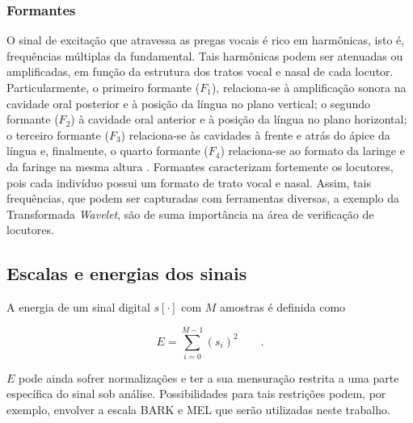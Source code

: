		\subsubsection{Formantes}
			\par O sinal de excitação que atravessa as pregas vocais é rico em harmônicas, isto é, frequências múltiplas da fundamental. Tais harmônicas podem ser atenuadas ou amplificadas, em função da estrutura dos tratos vocal e nasal de cada locutor. Particularmente, o primeiro formante ($F_1$), relaciona-se à  amplificação  sonora  na  cavidade  oral  posterior  e  à  posição  da  língua  no  plano  vertical;  o segundo  formante  ($F_2$)  à  cavidade  oral  anterior  e  à  posição  da  língua  no  plano  horizontal; o terceiro  formante  ($F_3$)  relaciona-se  às  cavidades  à  frente  e  atrás  do  ápice  da  língua e, finalmente,  o  quarto formante  ($F_4$) relaciona-se  ao  formato  da  laringe  e  da  faringe  na  mesma  altura  \cite{valencca2014analise}. Formantes caracterizam fortemente os locutores, pois cada indivíduo possui um formato de trato vocal e nasal. Assim, tais frequências, que podem ser capturadas com ferramentas diversas, a exemplo da Transformada \textit{Wavelet}, são de suma importância na área de verificação de locutores.
				
		\subsection{Escalas e energias dos sinais}
			\par A energia de um sinal digital $s[\cdot]$ com $M$ amostras é definida como
			
			\begin{equation}
				E = \sum\limits_{i=0}^{M-1}(s_i)^2 \qquad.   
			\end{equation}
			
			$E$ pode ainda sofrer normalizações e ter a sua mensuração restrita a uma parte específica do sinal sob análise. Possibilidades para tais restrições podem, por exemplo, envolver a escala BARK \cite{doi:10.1121-1.1908630} e MEL \cite{beranek1949acoustic} que serão utilizadas neste trabalho.
